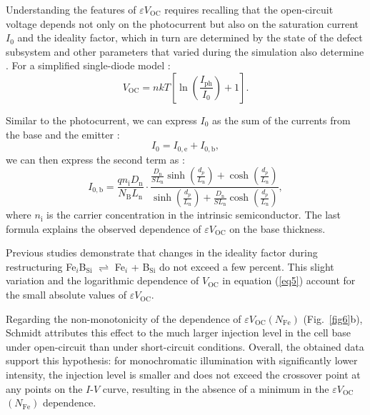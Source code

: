 \documentclass[a4paper,fleqn]{cas-sc}
\begin{document}
Understanding the features of $\varepsilon V_\mathrm{OC}$ requires recalling that the open-circuit voltage depends not only on the photocurrent but also on the saturation current $I_\mathrm{0}$ and the ideality factor, which in turn are determined by the state of the defect subsystem and other parameters that varied during the simulation also determine \cite{Olikh2019SM,YangHandbookPVSi}. For a simplified single-diode model \cite{YangHandbookPVSi}:
\begin{equation}
\label{eq5}
     V_\mathrm{OC} = nkT\left[ {\ln\left( {\frac{I_\mathrm{ph}}{I_\mathrm{0}}} \right)+1} \right].
\end{equation}

Similar to the photocurrent, we can express $I_\mathrm{0}$ as the sum of the currents from the base and the emitter \cite{Markvart}:
\begin{equation}
\label{eq6}
     I_\mathrm{0} = I_\mathrm{0,e}+I_\mathrm{0,b},
\end{equation}
we can then express the second term as \cite{Goetzberger1998}:
\begin{equation}
\label{eq7}
     I_\mathrm{0,b}=\frac{qn_\mathrm{i}D_\mathrm{n}}{N_\mathrm{B}L_\mathrm{n}}\cdot\frac{\frac{D_\mathrm{n}}{SL_\mathrm{n}}\sinh\left( \frac{d_p}{L_\mathrm{n}} \right)+\cosh\left( \frac{d_p}{L_\mathrm{n}} \right)}{\sinh\left( \frac{d_p}{L_\mathrm{n}} \right)+\frac{D_\mathrm{n}}{SL_\mathrm{n}}\cosh\left( \frac{d_p}{L_\mathrm{n}} \right)},
\end{equation}
where $n_\mathrm{i}$ is the carrier concentration in the intrinsic semiconductor. The last formula explains the observed dependence of $\varepsilon V_\mathrm{OC}$ on the base thickness.

Previous studies \cite{Olikh2022PPV,Olikh2019SM} demonstrate that changes in the ideality factor during restructuring Fe$_i$B$_\mathrm{Si}$ $\rightleftharpoons$ Fe$_i$ + B$_\mathrm{Si}$ do not exceed a few percent. This slight variation and the logarithmic dependence of $V_\mathrm{OC}$ in equation (\ref{eq5}) account for the small absolute values of $\varepsilon V_\mathrm{OC}$.

Regarding the non-monotonicity of the dependence of $\varepsilon V_\mathrm{OC}$$\left(N_\mathrm{Fe}\right)$ (Fig.~\ref{fig6}b), Schmidt \cite{FeB:Schmidt}  attributes this effect to the much larger injection level in the cell base under open-circuit than under short-circuit conditions. Overall, the obtained data support this hypothesis: for monochromatic illumination with significantly lower intensity, the injection level is smaller and does not exceed the crossover point \cite{FeB:Schmidt} at any points on the $I$-$V$ curve, resulting in the absence of a minimum in the $\varepsilon V_\mathrm{OC}$$\left(N_\mathrm{Fe}\right)$ dependence.
\end{document}
